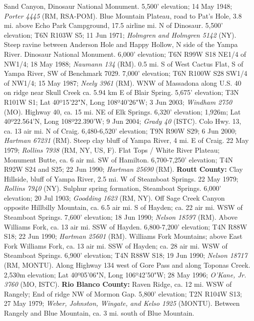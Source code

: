Sand Canyon, Dinosaur National Monument. 5,500' elevation; 14 May 1948;
\textit{Porter 4445} (RM, RSA-POM).
Blue Mountain Plateau, road to Pat's Hole, 3.8 mi. above Echo Park Campground,
17.5 airline mi. N of Dinosaur. 5,500' elevation; T6N R103W S5; 11 Jun 1971;
\textit{Holmgren and Holmgren 5142} (NY).
Steep ravine between Anderson Hole and Happy Hollow, N side of the Yampa River.
Dinosaur National Monument. 6,000' elevation; T6N R99W S18 NE1/4 of NW1/4;
18 May 1988; \textit{Naumann 134} (RM).
0.5 mi. S of West Cactus Flat, S of Yampa River, SW of Benchmark 7029. 7,000'
elevation; T6N R100W S28 SW1/4 of NW1/4; 15 May 1987; \textit{Neely 3961} (RM).
WNW of Massadona along U.S. 40 on ridge near Skull Creek ca. 5.94 km E of Blair
Spring. 5,675' elevation; T3N R101W S1; Lat 40º15'22"N, Long 108º40'26"W;
3 Jun 2003; \textit{Windham 2750} (MO).
Highway 40, ca. 15 mi. NE of Elk Springs. 6,320' elevation; 1,926m;
Lat 40º22.564'N, Long 108º22.390'W; 9 Jun 2004; \textit{Grady 40} (ISTC).
Colo Hwy. 13, ca. 13 air mi. N of Craig. 6,480-6,520' elevation; T9N R90W S29;
6 Jun 2000; \textit{Hartman 67231} (RM).
Steep clay bluff of Yampa River, 4 mi. E of Craig. 22 May 1979;
\textit{Rollins 7938} (RM, NY, US, F).
Flat Tops / White River Plateau; Monument Butte, ca. 6 air mi. SW of Hamilton.
6,700-7,250' elevation;  T4N R92W S24 and S25; 22 Jun 1990;
\textit{Hartman 25690} (RM).
  \textbf{Routt County:}
Clay Hillside, bluff of Yampa River, 2.5 mi. W of Steamboat Springs.
22 May 1979; \textit{Rollins 7940} (NY).
Sulphur spring formation, Steamboat Springs. 6,000' elevation; 20 Jul 1903;
\textit{Goodding 1623} (RM, NY).
Off Sage Creek Canyon opposite Hillbilly Mountain, ca. 6.5 air mi. S of Hayden;
ca. 22 air mi. WSW of Steamboat Springs. 7,600' elevation; 18 Jun 1990;
\textit{Nelson 18597} (RM).
Above Williams Fork, ca. 13 air mi. SSW of Hayden. 6,800-7,200' elevation;
T4N R88W S18; 22 Jun 1990; \textit{Hartman 25601} (RM).
Williams Fork Mountains; above East Fork Williams Fork, ca. 13 air mi. SSW of
Hayden; ca. 28 air mi. WSW of Steamboat Springs. 6,900' elevation; T4N R88W S18;
19 Jun 1990; \textit{Nelson 18717} (RM, MONTU).
Along Highway 134 west of Gore Pass and along Toponas Creek. 2,530m elevation;
Lat 40º05'06"N, Long 106º42'50"W; 28 May 1996;
\textit{O'Kane, Jr. 3760} (MO, ISTC).
  \textbf{Rio Blanco County:}
Raven Ridge, ca. 12 mi. WSW of Rangely; End of ridge NW of Mormon Gap.
5,800' elevation; T2N R104W S13; 27 May 1979;
\textit{Weber, Johnston, Wingate, and Kelso 1925} (MONTU).
Between Rangely and Blue Mountain, ca. 3 mi. south of Blue Mountain.
